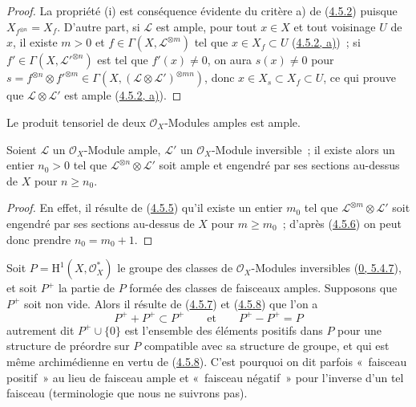 \begin{proof}
La propriété (i) est conséquence évidente du critère a) de
(\hyperref[II.4.5.2-fr]{4.5.2}) puisque $X_{f^{\otimes n}}=X_f$. D'autre
part, si $\mathcal{L}$ est ample, pour tout $x\in X$ et tout voisinage $U$ de
$x$, il existe $m>0$ et $f\in\Gamma(X,\mathcal{L}^{\otimes m})$ tel que
$x\in X_f\subset U$ (\hyperref[II.4.5.2-fr]{4.5.2, a)})~; si
$f'\in\Gamma(X,\mathcal{L}'^{\otimes n})$ est tel que $f'(x)\neq0$, on aura
$s(x)\neq0$ pour
$s=f^{\otimes n}\otimes f'^{\otimes m}\in
\Gamma(X,(\mathcal{L}\otimes\mathcal{L}')^{\otimes mn})$, donc
$x\in X_s\subset X_f\subset U$, ce qui prouve que
$\mathcal{L}\otimes\mathcal{L}'$ est ample
(\hyperref[II.4.5.2-fr]{4.5.2, a)}).
\end{proof}

\begin{corollary}[4.5.7]
\label{II.4.5.7-fr}
Le produit tensoriel de deux $\mathcal{O}_X$-Modules amples est ample.
\end{corollary}

\begin{corollary}[4.5.8]
\label{II.4.5.8-fr}
Soient $\mathcal{L}$ un $\mathcal{O}_X$-Module ample, $\mathcal{L}'$ un
$\mathcal{O}_X$-Module inversible~; il existe alors un entier $n_0>0$ tel
que $\mathcal{L}^{\otimes n}\otimes\mathcal{L}'$ soit ample et engendré par
ses sections au-dessus de $X$ pour $n\geq n_0$.
\end{corollary}

\begin{proof}
En effet, il résulte de (\hyperref[II.4.5.5-fr]{4.5.5}) qu'il existe un entier
$m_0$ tel que $\mathcal{L}^{\otimes m}\otimes\mathcal{L}'$ soit engendré par
ses sections au-dessus de $X$ pour $m\geq m_0$~; d'après
(\hyperref[II.4.5.6-fr]{4.5.6}) on peut donc prendre $n_0=m_0+1$.
\end{proof}

\begin{remark}[4.5.9]
\label{II.4.5.9-fr}
Soit $P=\mathrm{H}^1(X,\mathcal{O}_X^*)$ le groupe des classes de
$\mathcal{O}_X$-Modules inversibles (\hyperref[0.5.4.7-fr]{0, 5.4.7}), et
soit $P^+$ la partie de $P$ formée des classes de faisceaux amples. Supposons
que $P^+$ soit non vide. Alors il résulte de
(\hyperref[II.4.5.7-fr]{4.5.7}) et
(\hyperref[II.4.5.8-fr]{4.5.8}) que l'on a
\[
  P^++P^+\subset P^+
  \qquad\text{et}\qquad
  P^+-P^+=P
\]
autrement dit $P^+\cup\{0\}$ est l'ensemble des éléments positifs dans $P$
pour une structure de préordre sur $P$ compatible avec sa structure de
groupe, et qui est même archimédienne en vertu de
(\hyperref[II.4.5.8-fr]{4.5.8}). C'est pourquoi on dit parfois «~faisceau
positif~» au lieu de faisceau ample et «~faisceau négatif~» pour l'inverse
d'un tel faisceau (terminologie que nous ne suivrons pas).
\end{remark}

